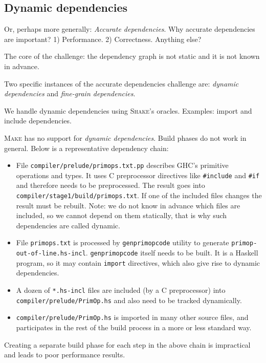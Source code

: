 \subsection{Dynamic dependencies}

Or, perhaps more generally: \emph{Accurate dependencies}. Why accurate
dependencies are important? 1) Performance. 2) Correctness. Anything else?

The core of the challenge: the dependency graph is not static and it is not
known in advance.

Two specific instances of the accurate dependencies challenge are: \emph{dynamic
dependencies} and \emph{fine-grain dependencies}.

We handle dynamic dependencies using \textsc{Shake}'s oracles. Examples: import
and include dependencies.

\textsc{Make} has no support for \emph{dynamic dependencies}. Build
phases do not work in general. Below is a representative dependency chain:



\begin{itemize}
  \item File \texttt{compiler/prelude/primops.txt.pp} describes GHC's primitive
  operations and types. It uses C preprocessor directives like
  \texttt{\#include} and \texttt{\#if} and therefore needs to be preprocessed.
  The result goes into \texttt{compiler/stage1/build/primops.txt}. If one of the
  included files changes the result must be rebuilt. Note: we do not know in
  advance which files are included, so we cannot depend on them statically,
  that is why such dependencies are called dynamic.
  \item File \texttt{primops.txt} is processed by \texttt{genprimopcode} utility
  to generate \texttt{primop-out-of-line.hs-incl}. \texttt{genprimopcode} itself
  needs to be built. It is a Haskell program, so it may contain \texttt{import}
  directives, which also give rise to dynamic dependencies.
  \item A dozen of \texttt{*.hs-incl} files are included (by a C preprocessor)
  into \texttt{compiler/prelude/PrimOp.hs} and also need to be tracked
  dynamically.
  \item \texttt{compiler/prelude/PrimOp.hs} is imported in many other source
  files, and participates in the rest of the build process in a more or less
  standard way.
\end{itemize}

\noindent Creating a separate build phase for each step in the above chain is
impractical and leads to poor performance results.

